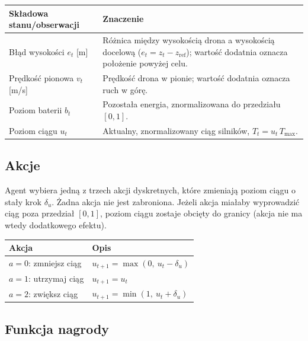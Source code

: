 \documentclass[12pt]{article}
\begin{document}
\begin{center}
\begin{tabular}{p{}p{}}
\toprule
Składowa stanu/obserwacji & Znaczenie \\
\midrule
Błąd wysokości $e_t$ [m] & Różnica między wysokością drona a wysokością docelową ($e_t = z_t - z_{\mathrm{ref}}$); wartość dodatnia oznacza położenie powyżej celu. \\
Prędkość pionowa $v_t$ [m/s] & Prędkość drona w pionie; wartość dodatnia oznacza ruch w górę. \\
Poziom baterii $b_t$ & Pozostała energia, znormalizowana do przedziału $[0,1]$. \\
Poziom ciągu $u_t$ & Aktualny, znormalizowany ciąg silników, $T_t = u_t\,T_{\max}$. \\
\bottomrule
\end{tabular}
\end{center}

\subsection{Akcje}

Agent wybiera jedną z trzech akcji dyskretnych, które zmieniają poziom ciągu o stały krok $\delta_u$. Żadna akcja nie jest zabroniona. Jeżeli akcja miałaby wyprowadzić ciąg poza przedział $[0,1]$, poziom ciągu zostaje obcięty do granicy (akcja nie ma wtedy dodatkowego efektu).

\begin{center}
\begin{tabular}{p{}p{}}
\toprule
Akcja & Opis \\
\midrule
$a=0$: zmniejsz ciąg & $u_{t+1} = \max(0,\ u_t - \delta_u)$ \\
$a=1$: utrzymaj ciąg & $u_{t+1} = u_t$ \\
$a=2$: zwiększ ciąg & $u_{t+1} = \min(1,\ u_t + \delta_u)$ \\
\bottomrule
\end{tabular}
\end{center}

\subsection{Funkcja nagrody}
\end{document}
